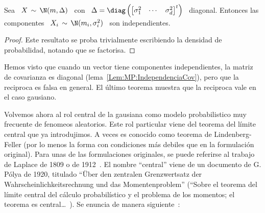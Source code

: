 %
\begin{teorema}[Independencia]
\label{Teo:MP:IndependenciaGaussiana}
%
  Sea   \   $X  \,   \sim   \,   \N(m,\Delta)$  \   con   \   $\Delta  =   \diag
  \left(  \begin{bmatrix}  \sigma_1^2  &  \cdots  &  \sigma_d^2  \end{bmatrix}^t
  \right)$   \  diagonal.   Entonces  las   componentes  \   $X_i  \,   \sim  \,
  \N(m_i,\sigma_i^2)$ \ son independientes.
\end{teorema}
%
\begin{proof}
  Este resultato se proba  trivialmente escribiendo la densidad de probabilidad,
  notando que se factorisa.
\end{proof}
%
Hemos visto que cuando un  vector tiene componentes independientes, la matriz de
covarianza  es   diagonal  (lema~\ref{Lem:MP:IndependenciaCov}),  pero   que  la
reciproca es falsa en general. El \'ultimo teorema muestra que la reciproca vale
en el caso gausiano.

Volvemos  ahora al rol  central de  la gausiana  como modelo  probabilistico muy
frecuente  de fenomeos  aleatorios. Este  rol particular  viene del  teorema del
l\'imite  central que  ya  introdujimos. A  veces  es conocido  como teorema  de
Lindenberg-Feller (por lo menos la forma con condiciones m\'as debiles que en la
formulaci\'on original).   Para unas de  las formulaciones originales,  se puede
referirse  al trabajo  de Laplace  de  1809 o  de 1912~\cite{Lap09,  Lap09:Supp,
  Lap12,  Lap14, Lap20}.   El nombre  ``central'' viene  de un  documento  de G.
P\'olya   de   1920,  titulado   ``\"Uber   den   zentralen  Grenzwertsatz   der
Wahrscheinlichkeitsrechnung  und das Momentenproblem''  (``Sobre el  teorema del
l\'imite central del  c\'alculo probabil\'istico y el problema  de los momentos;
el  teorema  es  central\ldots~\cite{Pol20,   Cam86}).   Se  enuncia  de  manera
siguiente~\cite{Spi76, BroDav87, LehCas98, AshDol99, JacPro03, AthLah06, Bil12}:

